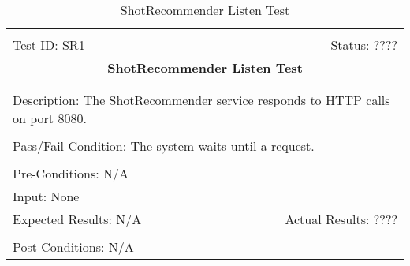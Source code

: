 \documentclass[11pt]{article}
\begin{document}
\begin{center}
\begin{table}[H]
\begin{tabular}{|l r|}\hline&\\[-2mm]
	Test ID: SR1	&Status: ????\\[-3mm]
	\multicolumn{2}{|c|}{\textbf{\large{ShotRecommender Listen Test}}}\\&\\\hline&\\[-3mm]
	\multicolumn{2}{|p{\textwidth}|}{Description: The ShotRecommender service responds to HTTP calls on port 8080.}\\[1mm]\hline&\\[-3mm]
	\multicolumn{2}{|p{\textwidth}|}{Pass/Fail Condition: The system waits until a request.}\\[1mm]\hline&\\[-3mm]
	\multicolumn{2}{|p{\textwidth}|}{Pre-Conditions: N/A}\\[4mm]
	\multicolumn{2}{|p{\textwidth}|}{Input: None}\\[2mm]\hline
	\multicolumn{1}{|p{0.49\textwidth}}{Expected Results: N/A}	&\multicolumn{1}{|p{0.45\textwidth}|}{Actual Results: ????}\\\hline&\\[-3mm]
	\multicolumn{2}{|p{\textwidth}|}{Post-Conditions: N/A}\\\hline
\end{tabular}
\caption{ShotRecommender Listen Test}
\end{table}
\end{center}
\end{document}
